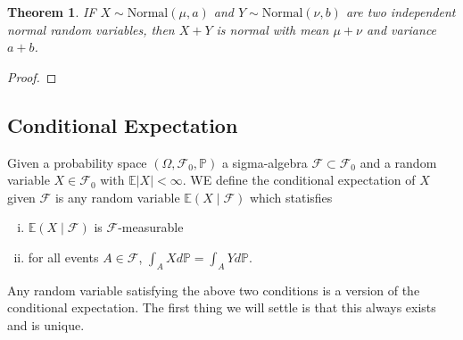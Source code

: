\documentclass[12pt]{article}
\newcommand{\calF}{\mathcal{F}}
\newcommand{\Prob}{\mathbb{P}}
\newcommand{\Expect}{\mathbb{E}}
\newcommand{\abs}[1]{ \left| #1 \right| }
\newtheorem{thm}{Theorem}[section]
\theoremstyle{definition}
\theoremstyle{remark}
\numberwithin{equation}{section}
\begin{document}
\begin{thm}
  IF $X\sim \text{Normal}(\mu, a)$ and $Y\sim \text{Normal}(\nu, b)$ are two independent normal random variables, then $X+Y$ is normal with mean $\mu + \nu$ and variance $a+b$.
\end{thm}


\begin{proof}
\end{proof}

\subsection{Conditional Expectation}%
\label{sub:conditional_expectation}

Given a probability space $(\Omega, \calF_0, \Prob)$ a sigma-algebra $\calF\subset\calF_0$ and a random variable $X\in\calF_0$ with $\Expect\abs{X}<\infty$. WE define the conditional expectation of $X$ given $\calF$ is any random variable $\Expect(X\mid\calF)$ which statisfies 
\begin{enumerate}[(i)]
  \item $\Expect(X\mid\calF)$ is $\calF$-measurable
  \item for all events $A\in\calF$, $\int_A X d\Prob = \int_A Yd\Prob$.
\end{enumerate}
 Any random variable satisfying the above two conditions is a version of the conditional expectation. The first thing we will settle is that this always exists and is unique. 
\end{document}
